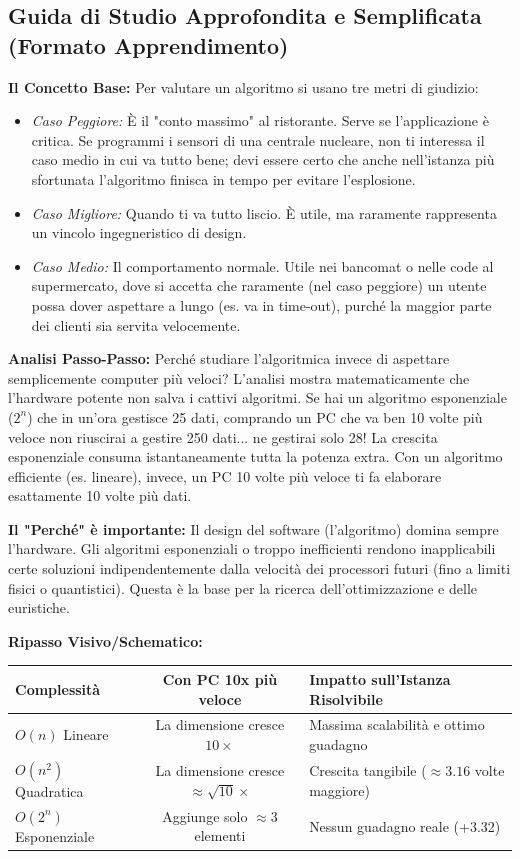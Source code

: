 \documentclass[a4paper, 11pt]{report}
\begin{document}
\vspace{0.5cm}
\subsection*{Guida di Studio Approfondita e Semplificata (Formato Apprendimento)}


\textbf{Il Concetto Base:}
Per valutare un algoritmo si usano tre metri di giudizio:
\begin{itemize}
\item \textit{Caso Peggiore:} È il "conto massimo" al ristorante. Serve se l'applicazione è critica. Se programmi i sensori di una centrale nucleare, non ti interessa il caso medio in cui va tutto bene; devi essere certo che anche nell'istanza più sfortunata l'algoritmo finisca in tempo per evitare l'esplosione.
\item \textit{Caso Migliore:} Quando ti va tutto liscio. È utile, ma raramente rappresenta un vincolo ingegneristico di design.
\item \textit{Caso Medio:} Il comportamento normale. Utile nei bancomat o nelle code al supermercato, dove si accetta che raramente (nel caso peggiore) un utente possa dover aspettare a lungo (es. va in time-out), purché la maggior parte dei clienti sia servita velocemente.
\end{itemize}

\textbf{Analisi Passo-Passo:}
Perché studiare l'algoritmica invece di aspettare semplicemente computer più veloci?
L'analisi mostra matematicamente che l'hardware potente non salva i cattivi algoritmi.
Se hai un algoritmo esponenziale ($2^n$) che in un'ora gestisce 25 dati, comprando un PC che va ben 10 volte più veloce non riuscirai a gestire 250 dati... ne gestirai solo 28! La crescita esponenziale consuma istantaneamente tutta la potenza extra. Con un algoritmo efficiente (es. lineare), invece, un PC 10 volte più veloce ti fa elaborare esattamente 10 volte più dati.

\textbf{Il "Perché" è importante:}
Il design del software (l'algoritmo) domina sempre l'hardware. Gli algoritmi esponenziali o troppo inefficienti rendono inapplicabili certe soluzioni indipendentemente dalla velocità dei processori futuri (fino a limiti fisici o quantistici). Questa è la base per la ricerca dell'ottimizzazione e delle euristiche.

\textbf{Ripasso Visivo/Schematico:}
\begin{center}
\begin{tabular}{|l|c|p{8cm}|}
\hline
\textbf{Complessità} & \textbf{Con PC 10x più veloce} & \textbf{Impatto sull'Istanza Risolvibile} \\
\hline
$O(n)$ Lineare & La dimensione cresce $10\times$ & Massima scalabilità e ottimo guadagno \\
\hline
$O(n^2)$ Quadratica & La dimensione cresce $\approx \sqrt{10}\times$ & Crescita tangibile ($\approx 3.16$ volte maggiore) \\
\hline
$O(2^n)$ Esponenziale & Aggiunge solo $\approx 3$ elementi & Nessun guadagno reale (+3.32) \\
\hline
\end{tabular}
\end{center}
\end{document}
